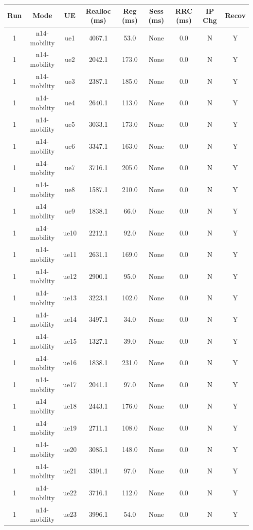 \begin{table}[ht]
\centering
\begin{tabular}{|c|c|c|c|c|c|c|c|c|}
\hline
Run & Mode & UE & Realloc (ms) & Reg (ms) & Sess (ms) & RRC (ms) & IP Chg & Recov \\
\hline
1 & n14-mobility & ue1 & 4067.1 & 53.0 & None & 0.0 & N & Y \\
1 & n14-mobility & ue2 & 2042.1 & 173.0 & None & 0.0 & N & Y \\
1 & n14-mobility & ue3 & 2387.1 & 185.0 & None & 0.0 & N & Y \\
1 & n14-mobility & ue4 & 2640.1 & 113.0 & None & 0.0 & N & Y \\
1 & n14-mobility & ue5 & 3033.1 & 173.0 & None & 0.0 & N & Y \\
1 & n14-mobility & ue6 & 3347.1 & 163.0 & None & 0.0 & N & Y \\
1 & n14-mobility & ue7 & 3716.1 & 205.0 & None & 0.0 & N & Y \\
1 & n14-mobility & ue8 & 1587.1 & 210.0 & None & 0.0 & N & Y \\
1 & n14-mobility & ue9 & 1838.1 & 66.0 & None & 0.0 & N & Y \\
1 & n14-mobility & ue10 & 2212.1 & 92.0 & None & 0.0 & N & Y \\
1 & n14-mobility & ue11 & 2631.1 & 169.0 & None & 0.0 & N & Y \\
1 & n14-mobility & ue12 & 2900.1 & 95.0 & None & 0.0 & N & Y \\
1 & n14-mobility & ue13 & 3223.1 & 102.0 & None & 0.0 & N & Y \\
1 & n14-mobility & ue14 & 3497.1 & 34.0 & None & 0.0 & N & Y \\
1 & n14-mobility & ue15 & 1327.1 & 39.0 & None & 0.0 & N & Y \\
1 & n14-mobility & ue16 & 1838.1 & 231.0 & None & 0.0 & N & Y \\
1 & n14-mobility & ue17 & 2041.1 & 97.0 & None & 0.0 & N & Y \\
1 & n14-mobility & ue18 & 2443.1 & 176.0 & None & 0.0 & N & Y \\
1 & n14-mobility & ue19 & 2711.1 & 108.0 & None & 0.0 & N & Y \\
1 & n14-mobility & ue20 & 3085.1 & 148.0 & None & 0.0 & N & Y \\
1 & n14-mobility & ue21 & 3391.1 & 97.0 & None & 0.0 & N & Y \\
1 & n14-mobility & ue22 & 3716.1 & 112.0 & None & 0.0 & N & Y \\
1 & n14-mobility & ue23 & 3996.1 & 54.0 & None & 0.0 & N & Y \\

\end{tabular}
\end{table}
